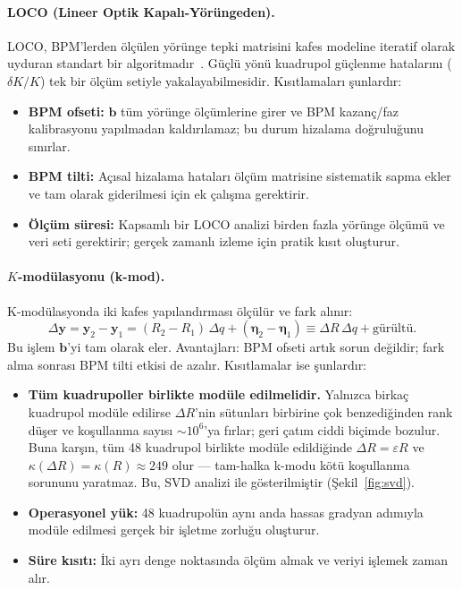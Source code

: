 \documentclass[preprint,12pt]{elsarticle}
\begin{document}
\paragraph{LOCO (Lineer Optik Kapalı-Yörüngeden).}
LOCO, BPM'lerden ölçülen yörünge tepki matrisini kafes modeline iteratif
olarak uyduran standart bir algoritmadır~\cite{safranek1997}. Güçlü yönü
kuadrupol güçlenme hatalarını ($\delta K/K$) tek bir ölçüm setiyle
yakalayabilmesidir. Kısıtlamaları şunlardır:
\begin{itemize}
  \item \textbf{BPM ofseti:} $\mathbf{b}$ tüm yörünge ölçümlerine girer
    ve BPM kazanç/faz kalibrasyonu yapılmadan kaldırılamaz; bu durum
    hizalama doğruluğunu sınırlar.
  \item \textbf{BPM tilti:} Açısal hizalama hataları ölçüm matrisine
    sistematik sapma ekler ve tam olarak giderilmesi için ek çalışma
    gerektirir.
  \item \textbf{Ölçüm süresi:} Kapsamlı bir LOCO analizi birden fazla
    yörünge ölçümü ve veri seti gerektirir; gerçek zamanlı izleme için
    pratik kısıt oluşturur.
\end{itemize}

\paragraph{$K$-modülasyonu (k-mod).}
K-modülasyonda iki kafes yapılandırması ölçülür ve fark alınır:
\begin{equation}
  \Delta\mathbf{y} = \mathbf{y}_2 - \mathbf{y}_1
  = (R_2 - R_1)\,\Delta q + (\boldsymbol{\eta}_2 - \boldsymbol{\eta}_1)
  \equiv \Delta R\,\Delta q + \text{gürültü}.
\end{equation}
Bu işlem $\mathbf{b}$'yi tam olarak eler. Avantajları:
BPM ofseti artık sorun değildir; fark alma sonrası BPM tilti etkisi de
azalır. Kısıtlamalar ise şunlardır:

\begin{itemize}
  \item \textbf{Tüm kuadrupoller birlikte modüle edilmelidir.}
    Yalnızca birkaç kuadrupol modüle edilirse $\Delta R$'nin sütunları
    birbirine çok benzediğinden rank düşer ve koşullanma sayısı $\sim10^6$'ya
    fırlar; geri çatım ciddi biçimde bozulur. Buna karşın, tüm 48 kuadrupol
    birlikte modüle edildiğinde $\Delta R = \varepsilon R$ ve
    $\kappa(\Delta R) = \kappa(R) \approx 249$ olur — tam-halka k-modu
    kötü koşullanma sorununu yaratmaz. Bu, SVD analizi ile gösterilmiştir
    (Şekil~\ref{fig:svd}).
  \item \textbf{Operasyonel yük:} 48 kuadrupolün aynı anda hassas gradyan
    adımıyla modüle edilmesi gerçek bir işletme zorluğu oluşturur.
  \item \textbf{Süre kısıtı:} İki ayrı denge noktasında ölçüm almak ve
    veriyi işlemek zaman alır.
\end{itemize}
\end{document}
